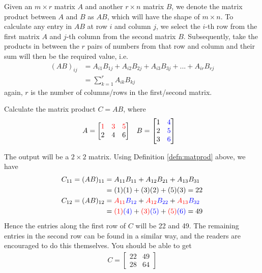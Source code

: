 \begin{defn}
\label{defn:matprod}
Given an $m \times r$ matrix $A$ and another $r \times n$ matrix $B$, we denote the matrix product between $A$ and $B$ as $AB$, which will have the shape of $m \times n$. To calculate any entry in $AB$ at row $i$ and column $j$, we select the $i$-th row from the first matrix $A$ and $j$-th column from the second matrix $B$. Subsequently, take the products in between the $r$ pairs of numbers from that row and column and their sum will then be the required value, i.e.\
\begin{subequations}
\begin{align}
(AB)_{ij} &= A_{i1}B_{1j} + A_{i2}B_{2j} + A_{i3}B_{3j} + ... + A_{ir}B_{rj} \\
&= \sum_{k=1}^{r} A_{ik}B_{kj}
\end{align}    
\end{subequations}
again, $r$ is the number of columns/rows in the first/second matrix.
\end{defn}
\begin{exmp}
Calculate the matrix product $C = AB$, where
\begin{align*}
& A = 
\begin{bmatrix}
\mathcolor{red}{1} & \mathcolor{red}{3} & \mathcolor{red}{5} \\
2 & 4 & 6 
\end{bmatrix} &
& B = 
\begin{bmatrix}
1 & \mathcolor{blue}{4} \\
2 & \mathcolor{blue}{5} \\
3 & \mathcolor{blue}{6}
\end{bmatrix}
\end{align*}
\end{exmp}
\begin{solution}
The output will be a $2 \times 2$ matrix. Using Definition \ref{defn:matprod} above, we have
\begin{align*}
C_{11} = (AB)_{11} &= A_{11}B_{11} + A_{12}B_{21} + A_{13}B_{31} \\
&= (1)(1) + (3)(2) + (5)(3) = 22 \\
C_{12} = (AB)_{12} &= \textcolor{red}{A_{11}}\textcolor{blue}{B_{12}} + \textcolor{red}{A_{12}}\textcolor{blue}{B_{22}} + \textcolor{red}{A_{13}}\textcolor{blue}{B_{32}} \\
&= \textcolor{red}{(1)}\textcolor{blue}{(4)} + \textcolor{red}{(3)}\textcolor{blue}{(5)} + \textcolor{red}{(5)}\textcolor{blue}{(6)} = 49
\end{align*}
Hence the entries along the first row of $C$ will be 22 and 49. The remaining entries in the second row can be found in a similar way, and the readers are encouraged to do this themselves. You should be able to get
\begin{align*}
C = 
\begin{bmatrix}
22 & 49 \\
28 & 64
\end{bmatrix}   
\end{align*}
\end{solution}

